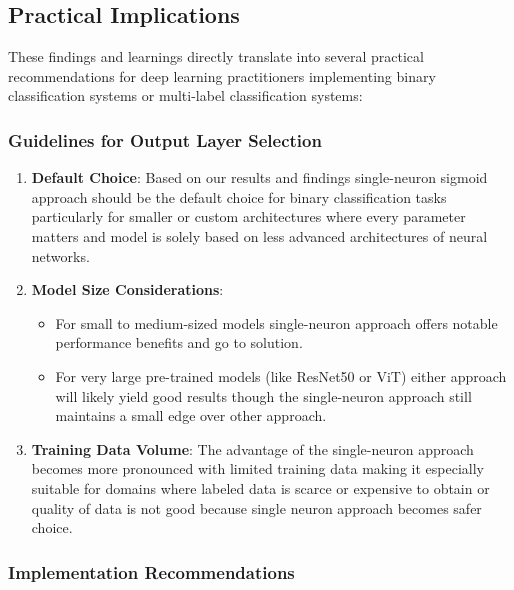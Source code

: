 \subsection{Practical Implications}

These findings and learnings directly translate into several practical recommendations for deep learning practitioners implementing binary classification systems or multi-label classification systems:

\subsubsection{Guidelines for Output Layer Selection}

\begin{enumerate}
\item \textbf{Default Choice}: Based on our results and findings single-neuron sigmoid approach should be the default choice for binary classification tasks particularly for smaller or custom architectures where every parameter matters and model is solely based on less advanced architectures of neural networks.

\item \textbf{Model Size Considerations}: 
   \begin{itemize}
   \item For small to medium-sized models single-neuron approach offers notable performance benefits and go to solution.
   \item For very large pre-trained models (like ResNet50 or ViT) either approach will likely yield good results though the single-neuron approach still maintains a small edge over other approach.
   \end{itemize}

\item \textbf{Training Data Volume}: The advantage of the single-neuron approach becomes more pronounced with limited training data making it especially suitable for domains where labeled data is scarce or expensive to obtain or quality of data is not good because single neuron approach becomes safer choice.
\end{enumerate}

\subsubsection{Implementation Recommendations}

